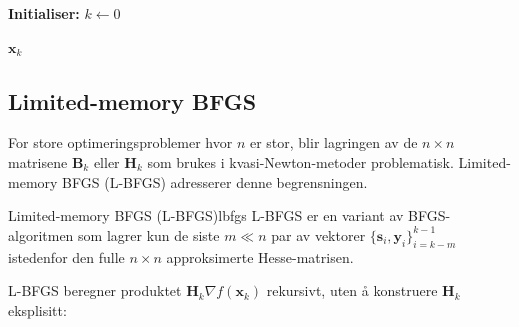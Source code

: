 \begin{algorithm}[H]
	\SetAlgoLined

	\textbf{Initialiser:} \( k \gets 0 \)\;

	\Return \( \mathbf{x}_k \)\;
	\caption{BFGS Kvasi-Newton Metode}
	\label{alg:bfgs}
\end{algorithm}

\subsection{Limited-memory BFGS}
\label{subsec:lbfgs}

For store optimeringsproblemer hvor $n$ er stor, blir lagringen av de $n \times n$ matrisene $\symbf{B}_k$ eller $\symbf{H}_k$ som brukes i kvasi-Newton-metoder problematisk. Limited-memory BFGS (L-BFGS) adresserer denne begrensningen.

\begin{definition}{Limited-memory BFGS (L-BFGS)}{lbfgs}
	L-BFGS er en variant av BFGS-algoritmen som lagrer kun de siste $m \ll n$ par av vektorer $\{\symbf{s}_i, \symbf{y}_i\}_{i=k-m}^{k-1}$ istedenfor den fulle $n \times n$ approksimerte Hesse-matrisen.
\end{definition}

L-BFGS beregner produktet $\symbf{H}_k \nabla f(\symbf{x}_k)$ rekursivt, uten å konstruere $\symbf{H}_k$ eksplisitt:

